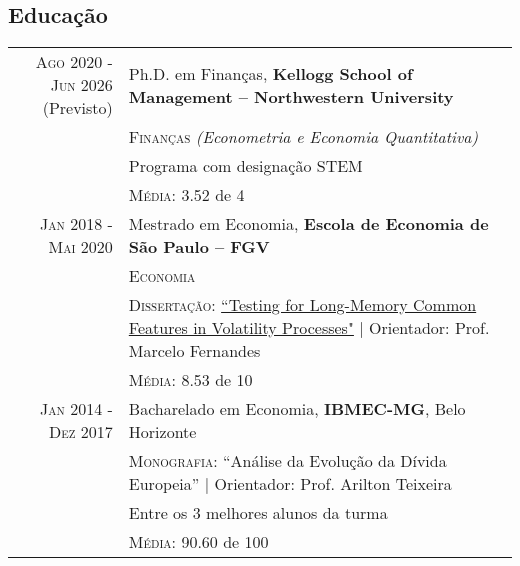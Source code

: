 \documentclass[a4paper,10pt]{article}
\begin{document}
\begin{samepage}

\section{Educação}
\begin{tabular}{r|p{10.75cm}}
    \textsc{Ago} 2020 - \parbox[t]{1.5cm}{\centering \textsc{Jun} 2026\\ (Previsto)} & Ph.D. em Finanças, \normalsize\textbf{Kellogg School of Management – Northwestern University} \\
    & \textsc{Finanças} \textit{(Econometria e Economia Quantitativa)} \\
    & \normalsize Programa com designação \textsc{STEM} \\
    & \normalsize \textsc{Média}: 3.52 de 4 \\
    \textsc{Jan} 2018 - \textsc{Mai} 2020 & Mestrado em Economia, \normalsize\textbf{Escola de Economia de São Paulo – FGV} \\
    & \textsc{Economia} \\
    & \normalsize \textsc{Dissertação}: \href{http://hdl.handle.net/10438/29188}{``Testing for Long-Memory Common Features in Volatility Processes"} | \small Orientador: Prof. Marcelo Fernandes \\
    & \normalsize \textsc{Média}: 8.53 de 10 \\
    \textsc{Jan} 2014 - \textsc{Dez} 2017 & Bacharelado em Economia, \normalsize\textbf{IBMEC-MG}, Belo Horizonte \\
    & \normalsize \textsc{Monografia}: “Análise da Evolução da Dívida Europeia” | \small Orientador: Prof. Arilton Teixeira \\
    & Entre os 3 melhores alunos da turma \\
    & \textsc{Média}: 90.60 de 100
\end{tabular}


\end{samepage}
\end{document}
